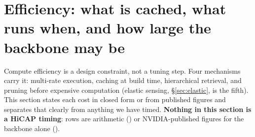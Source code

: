 \section{Efficiency: what is cached, what runs when, and how large the backbone may be}\label{sec:eff}
Compute efficiency is a design constraint, not a tuning step. Four mechanisms carry it: multi-rate execution, caching at build time, hierarchical retrieval,
and pruning before expensive computation (elastic sensing, \S\ref{sec:elastic}, is the fifth). This section states each cost in closed form or from published
figures and separates that clearly from anything we have timed. \textbf{Nothing in this section is a HiCAP timing}: rows are arithmetic (\evE) or NVIDIA-published
figures for the backbone alone (\evP).

